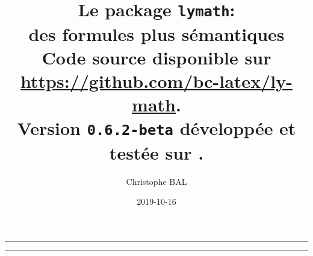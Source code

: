 \documentclass[12pt,a4paper]{article}
\begin{document}
\renewcommand\labelitemi{\raisebox{0.125em}{\tiny\textbullet}}
\renewcommand{\labelitemii}{---}

\title{%
	Le package \texttt{lymath}:\\%
	des formules plus sémantiques\\%
	{\footnotesize Code source disponible sur \url{https://github.com/bc-latex/ly-math}.}\\%
{\footnotesize Version \texttt{0.6.2-beta} développée et testée sur \macosxname{}.}%
}
\author{Christophe BAL}
\date{2019-10-16}

\maketitle


\vspace{2em}

\hrule

\tableofcontents

\vspace{1.5em}

\hrule

\newpage

\end{document}
